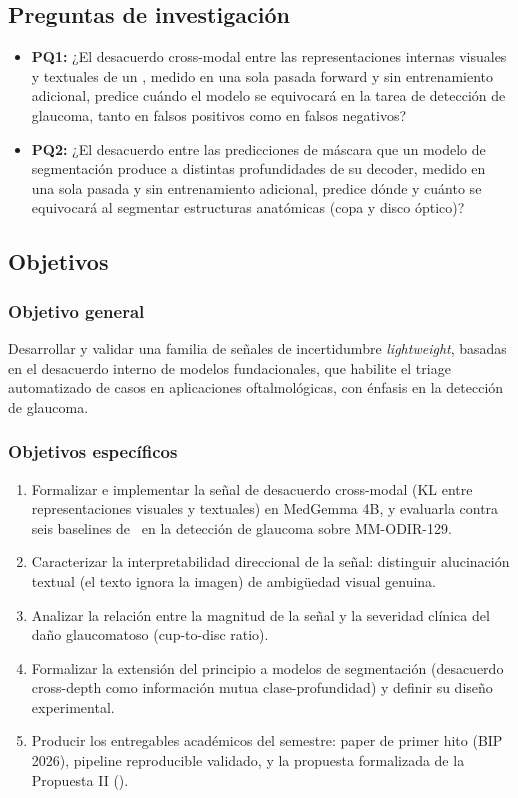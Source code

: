 \documentclass[12pt,a4paper]{article}
\newcommand{\UQ}{\text{UQ}}
\newcommand{\MedVLM}{\text{MedVLM}}
\begin{document}
\subsection{Preguntas de investigación}

\begin{itemize}[leftmargin=2em]
    \item \textbf{PQ1:} ¿El desacuerdo cross-modal entre las representaciones internas visuales y textuales de un \MedVLM, medido en una sola pasada forward y sin entrenamiento adicional, predice cuándo el modelo se equivocará en la tarea de detección de glaucoma, tanto en falsos positivos como en falsos negativos?

    \item \textbf{PQ2:} ¿El desacuerdo entre las predicciones de máscara que un modelo de segmentación produce a distintas profundidades de su decoder, medido en una sola pasada y sin entrenamiento adicional, predice dónde y cuánto se equivocará al segmentar estructuras anatómicas (copa y disco óptico)?
\end{itemize}

\subsection{Objetivos}

\subsubsection{Objetivo general}

Desarrollar y validar una familia de señales de incertidumbre \textit{lightweight}, basadas en el desacuerdo interno de modelos fundacionales, que habilite el triage automatizado de casos en aplicaciones oftalmológicas, con énfasis en la detección de glaucoma.

\subsubsection{Objetivos específicos}

\begin{enumerate}[leftmargin=2em]
    \item Formalizar e implementar la señal de desacuerdo cross-modal (KL entre representaciones visuales y textuales) en MedGemma 4B, y evaluarla contra seis baselines de \UQ\ en la detección de glaucoma sobre MM-ODIR-129.
    \item Caracterizar la interpretabilidad direccional de la señal: distinguir alucinación textual (el texto ignora la imagen) de ambigüedad visual genuina.
    \item Analizar la relación entre la magnitud de la señal y la severidad clínica del daño glaucomatoso (cup-to-disc ratio).
    \item Formalizar la extensión del principio a modelos de segmentación (desacuerdo cross-depth como información mutua clase-profundidad) y definir su diseño experimental.
    \item Producir los entregables académicos del semestre: paper de primer hito (BIP 2026), pipeline reproducible validado, y la propuesta formalizada de la Propuesta II ().
\end{enumerate}
\end{document}
